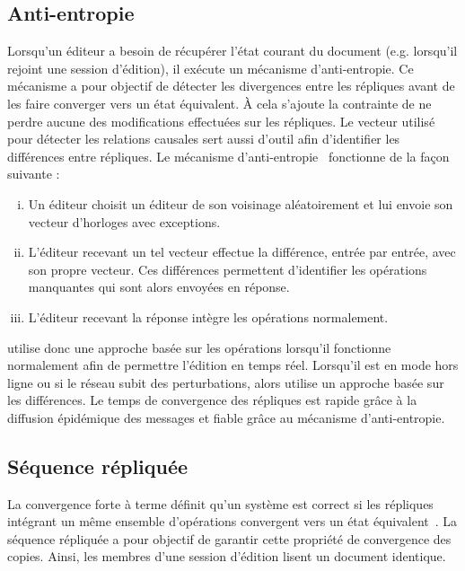 \subsection{Anti-entropie}

Lorsqu'un éditeur a besoin de récupérer l'état courant du document
(e.g. lorsqu'il rejoint une session d'édition), il exécute un mécanisme
d'anti-entropie.  Ce mécanisme a pour objectif de détecter les divergences entre
les répliques avant de les faire converger vers un état équivalent. À cela
s'ajoute la contrainte de ne perdre aucune des modifications effectuées sur les
répliques. Le vecteur utilisé pour détecter les relations causales sert aussi
d'outil afin d'identifier les différences entre répliques. Le mécanisme
d'anti-entropie~\cite{demers1987epidemic, vanderlinde2016delta} fonctionne de la
façon suivante :
\begin{enumerate}[(i)]
\item Un éditeur choisit un éditeur de son voisinage aléatoirement et lui envoie
  son vecteur d'horloges avec exceptions.
\item L'éditeur recevant un tel vecteur effectue la différence, entrée par
  entrée, avec son propre vecteur. Ces différences permettent d'identifier les
  opérations manquantes qui sont alors envoyées en réponse.
\item L'éditeur recevant la réponse intègre les opérations normalement.
\end{enumerate}

\CRATE utilise donc une approche basée sur les opérations lorsqu'il fonctionne
normalement afin de permettre l'édition en temps réel. Lorsqu'il est en mode
hors ligne ou si le réseau subit des perturbations, alors \CRATE utilise un
approche basée sur les différences. Le temps de convergence des répliques est
rapide grâce à la diffusion épidémique des messages et fiable grâce au
mécanisme d'anti-entropie.


\subsection{Séquence répliquée}

La convergence forte à terme définit qu'un système est correct si les répliques
intégrant un même ensemble d'opérations convergent vers un état
équivalent~\cite{shapiro2011conflict}. La séquence répliquée a pour objectif de
garantir cette propriété de convergence des copies. Ainsi, les membres d'une
session d'édition lisent un document identique.

